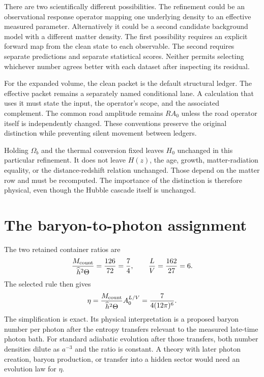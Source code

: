 There are two scientifically different possibilities. The refinement could be an observational response operator mapping one underlying density to an effective measured parameter. Alternatively it could be a second candidate background model with a different matter density. The first possibility requires an explicit forward map from the clean state to each observable. The second requires separate predictions and separate statistical scores. Neither permits selecting whichever number agrees better with each dataset after inspecting its residual.

For the expanded volume, the clean packet is the default structural ledger. The effective packet remains a separately named conditional lane. A calculation that uses it must state the input, the operator's scope, and the associated complement. The common road amplitude remains $RA_0$ unless the road operator itself is independently changed. These conventions preserve the original distinction while preventing silent movement between ledgers.

Holding $\Omega_b$ and the thermal conversion fixed leaves $H_0$ unchanged in this particular refinement. It does not leave $H(z)$, the age, growth, matter-radiation equality, or the distance-redshift relation unchanged. Those depend on the matter row and must be recomputed. The importance of the distinction is therefore physical, even though the Hubble cascade itself is unchanged.

\section{The baryon-to-photon assignment}
The two retained container ratios are
\begin{equation}
 \frac{M_{\rm count}}{\widehat h^2\Theta}=\frac{126}{72}=\frac74,
 \qquad \frac LV=\frac{162}{27}=6.
 \label{c8:ratios}
\end{equation}
The selected rule then gives
\begin{equation}
 \eta=\frac{M_{\rm count}}{\widehat h^2\Theta}
       A_0^{L/V}=\frac7{4(12\pi)^6}.
 \label{c8:etacontainers}
\end{equation}
The simplification is exact. Its physical interpretation is a proposed baryon number per photon after the entropy transfers relevant to the measured late-time photon bath. For standard adiabatic evolution after those transfers, both number densities dilute as $a^{-3}$ and the ratio is constant. A theory with later photon creation, baryon production, or transfer into a hidden sector would need an evolution law for $\eta$.

